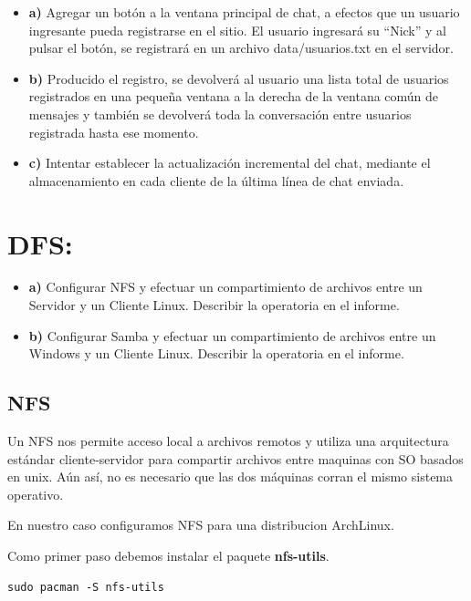 \documentclass[12pt]{extarticle}
\begin{document}
\begin{itemize}
\item
  \textbf{a)} Agregar un botón a la ventana principal de chat, a efectos
  que un usuario ingresante pueda registrarse en el sitio. El usuario
  ingresará su ``Nick'' y al pulsar el botón, se registrará en un
  archivo data/usuarios.txt en el servidor.
\item
  \textbf{b)} Producido el registro, se devolverá al usuario una lista
  total de usuarios registrados en una pequeña ventana a la derecha de
  la ventana común de mensajes y también se devolverá toda la
  conversación entre usuarios registrada hasta ese momento.
\item
  \textbf{c)} Intentar establecer la actualización incremental del chat,
  mediante el almacenamiento en cada cliente de la última línea de chat
  enviada.
\end{itemize}

    \section{DFS:}\label{dfs}

\begin{itemize}
\item
  \textbf{a)} Configurar NFS y efectuar un compartimiento de archivos
  entre un Servidor y un Cliente Linux. Describir la operatoria en el
  informe.
\item
  \textbf{b)} Configurar Samba y efectuar un compartimiento de archivos
  entre un Windows y un Cliente Linux. Describir la operatoria en el
  informe.
\end{itemize}

    \subsection{NFS}\label{nfs}

Un NFS nos permite acceso local a archivos remotos y utiliza una
arquitectura estándar cliente-servidor para compartir archivos entre
maquinas con SO basados en unix. Aún así, no es necesario que las dos
máquinas corran el mismo sistema operativo.

En nuestro caso configuramos NFS para una distribucion ArchLinux.

Como primer paso debemos instalar el paquete \textbf{nfs-utils}.

\begin{verbatim}
sudo pacman -S nfs-utils
\end{verbatim}
\end{document}

